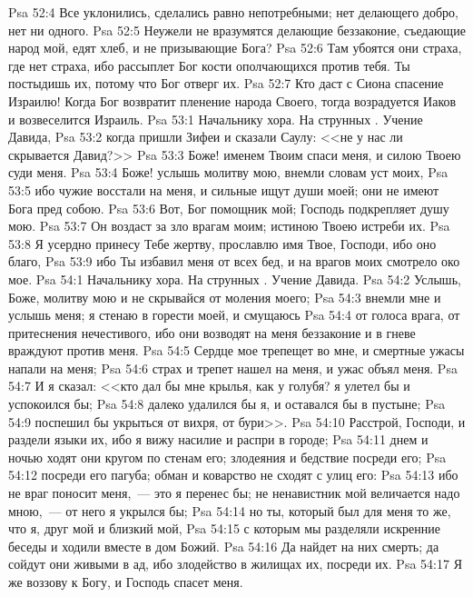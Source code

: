 \vs Psa 52:4 Все уклонились, сделались равно непотребными; нет делающего добро, нет ни одного.
\vs Psa 52:5 Неужели не вразумятся делающие беззаконие, съедающие народ мой,  едят хлеб, и не призывающие Бога?
\vs Psa 52:6 Там убоятся они страха, где нет страха, ибо рассыплет Бог кости ополчающихся против тебя. Ты постыдишь их, потому что Бог отверг их.
\vs Psa 52:7 Кто даст с Сиона спасение Израилю! Когда Бог возвратит пленение народа Своего, тогда возрадуется Иаков и возвеселится Израиль.
\vs Psa 53:1 Начальнику хора. На струнных . Учение Давида,
\vs Psa 53:2 когда пришли Зифеи и сказали Саулу: <<не у нас ли скрывается Давид?>>
\rsbpar\vs Psa 53:3 Боже! именем Твоим спаси меня, и силою Твоею суди меня.
\vs Psa 53:4 Боже! услышь молитву мою, внемли словам уст моих,
\vs Psa 53:5 ибо чужие восстали на меня, и сильные ищут души моей; они не имеют Бога пред собою.
\vs Psa 53:6 Вот, Бог помощник мой; Господь подкрепляет душу мою.
\vs Psa 53:7 Он воздаст за зло врагам моим; истиною Твоею истреби их.
\vs Psa 53:8 Я усердно принесу Тебе жертву, прославлю имя Твое, Господи, ибо оно благо,
\vs Psa 53:9 ибо Ты избавил меня от всех бед, и на врагов моих смотрело око мое.
\vs Psa 54:1 Начальнику хора. На струнных . Учение Давида.
\rsbpar\vs Psa 54:2 Услышь, Боже, молитву мою и не скрывайся от моления моего;
\vs Psa 54:3 внемли мне и услышь меня; я стенаю в горести моей, и смущаюсь
\vs Psa 54:4 от голоса врага, от притеснения нечестивого, ибо они возводят на меня беззаконие и в гневе враждуют против меня.
\vs Psa 54:5 Сердце мое трепещет во мне, и смертные ужасы напали на меня;
\vs Psa 54:6 страх и трепет нашел на меня, и ужас объял меня.
\vs Psa 54:7 И я сказал: <<кто дал бы мне крылья, как у голубя? я улетел бы и успокоился бы;
\vs Psa 54:8 далеко удалился бы я, и оставался бы в пустыне;
\vs Psa 54:9 поспешил бы укрыться от вихря, от бури>>.
\vs Psa 54:10 Расстрой, Господи, и раздели языки их, ибо я вижу насилие и распри в городе;
\vs Psa 54:11 днем и ночью ходят они кругом по стенам его; злодеяния и бедствие посреди его;
\vs Psa 54:12 посреди его пагуба; обман и коварство не сходят с улиц его:
\vs Psa 54:13 ибо не враг поносит меня,~--- это я перенес бы; не ненавистник мой величается надо мною,~--- от него я укрылся бы;
\vs Psa 54:14 но ты, который был для меня то же, что я, друг мой и близкий мой,
\vs Psa 54:15 с которым мы разделяли искренние беседы и ходили вместе в дом Божий.
\vs Psa 54:16 Да найдет на них смерть; да сойдут они живыми в ад, ибо злодейство в жилищах их, посреди их.
\vs Psa 54:17 Я же воззову к Богу, и Господь спасет меня.
